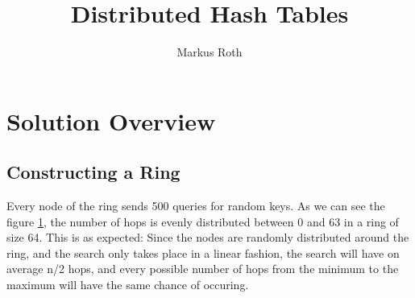 \documentclass[a4paper]{article}
\title{Distributed Hash Tables}
\author{Markus Roth}
\begin{document}
\maketitle

\tableofcontents

\section{Solution Overview}

\subsection{Constructing a Ring}

\begin{figure}
    
    \label{fig:2-1}
\end{figure}

Every node of the ring sends 500 queries for random keys. As we can see the figure \ref{fig:2-1}, the number of hops is evenly distributed between 0 and 63 in a ring of size 64. This is as expected: Since the nodes are randomly distributed around the ring, and the search only takes place in a linear fashion, the search will have on average n/2 hops, and every possible number of hops from the minimum to the maximum will have the same chance of occuring.
\end{document}
